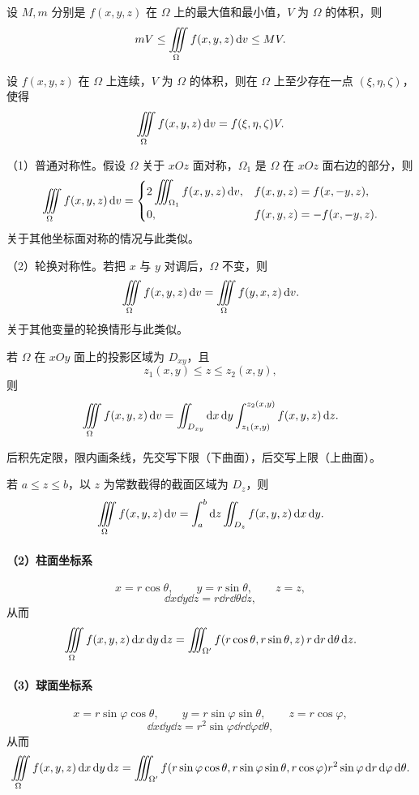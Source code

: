 设 $M,m$ 分别是 $f(x,y,z)$ 在 $\Omega$ 上的最大值和最小值，$V$ 为 $\Omega$ 的体积，则
\[
mV\le\iiint\limits_{\Omega} f(x,y,z)\mathop{}\!\mathrm d v\le MV.
\]

设 $f(x,y,z)$ 在 $\Omega$ 上连续，$V$ 为 $\Omega$ 的体积，则在 $\Omega$ 上至少存在一点 $(\xi,\eta,\zeta)$，使得
\[
\iiint\limits_{\Omega} f(x,y,z)\mathop{}\!\mathrm d v=f(\xi,\eta,\zeta)V.
\]


（1）普通对称性。假设 $\Omega$ 关于 $xOz$ 面对称，$\Omega_1$ 是 $\Omega$ 在 $xOz$ 面右边的部分，则
\[
\iiint\limits_{\Omega} f(x,y,z)\mathop{}\!\mathrm d v=
\begin{cases}
2\displaystyle\iiint_{\Omega_1}f(x,y,z)\mathop{}\!\mathrm d v,
&f(x,y,z)=f(x,-y,z),\\[2mm]
0,&f(x,y,z)=-f(x,-y,z).
\end{cases}
\]
关于其他坐标面对称的情况与此类似。

（2）轮换对称性。若把 $x$ 与 $y$ 对调后，$\Omega$ 不变，则
\[
\iiint\limits_{\Omega} f(x,y,z)\mathop{}\!\mathrm d v=\iiint\limits_{\Omega} f(y,x,z)\mathop{}\!\mathrm d v.
\]
关于其他变量的轮换情形与此类似。



若 $\Omega$ 在 $xOy$ 面上的投影区域为 $D_{xy}$，且
\[
z_1(x,y)\le z\le z_2(x,y),
\]
则
\[
\iiint\limits_{\Omega} f(x,y,z)\mathop{}\!\mathrm d v
=\iint_{D_{xy}}\mathop{}\!\mathrm d x\mathop{}\!\mathrm d y
\int_{z_1(x,y)}^{z_2(x,y)}f(x,y,z)\mathop{}\!\mathrm d z.
\]

\begin{notebox}[定限原则]
后积先定限，限内画条线，先交写下限（下曲面），后交写上限（上曲面）。
\end{notebox}

若 $a\le z\le b$，以 $z$ 为常数截得的截面区域为 $D_z$，则
\[
\iiint\limits_{\Omega} f(x,y,z)\mathop{}\!\mathrm d v
=\int_a^b\mathop{}\!\mathrm d z\iint_{D_z}f(x,y,z)\mathop{}\!\mathrm d x\mathop{}\!\mathrm d y.
\]

\paragraph{（2）柱面坐标系}
\[
x=r\cos\theta,\qquad y=r\sin\theta,\qquad z=z,
\]
\[
\dd x\dd y\dd z=r\dd r\dd\theta\dd z,
\]
从而
\[
\iiint\limits_{\Omega} f(x,y,z)\mathop{}\!\mathrm d x\mathop{}\!\mathrm d y\mathop{}\!\mathrm d z
=\iiint_{\Omega'}f(r\cos\theta,r\sin\theta,z)\,r\mathop{}\!\mathrm d r\mathop{}\!\mathrm d\theta\mathop{}\!\mathrm d z.
\]

\paragraph{（3）球面坐标系}
\[
x=r\sin\varphi\cos\theta,\qquad
y=r\sin\varphi\sin\theta,\qquad
z=r\cos\varphi,
\]
\[
\dd x\dd y\dd z=r^2\sin\varphi\dd r\dd\varphi\dd\theta,
\]
从而
\[
\iiint\limits_{\Omega} f(x,y,z)\mathop{}\!\mathrm d x\mathop{}\!\mathrm d y\mathop{}\!\mathrm d z
=\iiint_{\Omega'}f(r\sin\varphi\cos\theta,r\sin\varphi\sin\theta,r\cos\varphi)
r^2\sin\varphi\mathop{}\!\mathrm d r\mathop{}\!\mathrm d\varphi\mathop{}\!\mathrm d\theta.
\]

